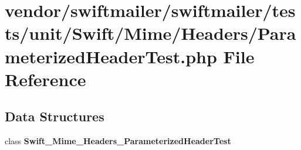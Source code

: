 \section{vendor/swiftmailer/swiftmailer/tests/unit/\+Swift/\+Mime/\+Headers/\+Parameterized\+Header\+Test.php File Reference}
\label{_parameterized_header_test_8php}
\subsection*{Data Structures}
\begin{DoxyCompactItemize}
\item 
class {\bf Swift\+\_\+\+Mime\+\_\+\+Headers\+\_\+\+Parameterized\+Header\+Test}
\end{DoxyCompactItemize}
